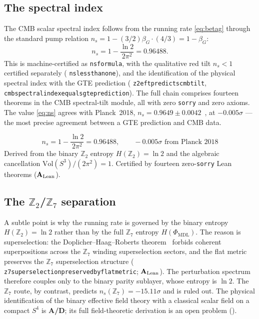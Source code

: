 \documentclass[11pt]{article}
\theoremstyle{remark}
\newcommand{\PHIMDL}{\Phi_{\mathrm{MDL}}}
\newcommand{\ZS}{\mathbb{Z}_7}
\newcommand{\ZT}{\mathbb{Z}_2}
\newcommand{\lean}[1]{%
  \penalty-100
  \begingroup\def\_{\textunderscore\allowbreak}\texttt{#1}\endgroup}
\newcommand{\ns}{n_s}
\newcommand{\betaG}{\beta_G}
\newcommand{\CatAL}{\ensuremath{\textbf{A}_{\rm Lean}}}
\newcommand{\CatAD}{\textbf{A/D}}
\begin{document}
\subsection{The spectral index}

The CMB scalar spectral index follows from the running rate \eqref{eq:betag}
through the standard pump relation $\ns = 1 - (3/2)\betaG\cdot(4/3) = 1 - \betaG$:
\begin{equation}
  \boxed{\ \ns = 1 - \frac{\ln 2}{2\pi^2} = 0.96488.\ }
  \label{eq:ns}
\end{equation}
This is machine-certified as \lean{n\_s\_formula}, with the qualitative red tilt
$\ns < 1$ certified separately (\lean{n\_s\_less\_than\_one}), and the identification
of the physical spectral index with the GTE prediction
(\lean{z2\_eft\_predicts\_cmb\_tilt}, \lean{cmb\_spectral\_index\_equals\_gte\_prediction}).
The full chain comprises fourteen theorems in the CMB spectral-tilt module, all with
zero \texttt{sorry} and zero axioms. The value \eqref{eq:ns} agrees with Planck~2018,
$\ns = 0.9649 \pm 0.0042$~\cite{Planck2018}, at $-0.005\sigma$ --- the most precise
agreement between a GTE prediction and CMB data.

\begin{tcolorbox}[colback=green!5,colframe=green!50!black,
  title={\textbf{Key Result: CMB Scalar Spectral Index}},
  fonttitle=\bfseries,left=6pt,right=6pt,top=5pt,bottom=5pt]
\small
\[
  \ns = 1 - \frac{\ln 2}{2\pi^2} = 0.96488,\qquad
  -0.005\sigma\text{ from Planck~2018}
\]
Derived from the binary $\ZT$ entropy $H(\ZT)=\ln 2$ and the algebraic
cancellation $\mathrm{Vol}(S^3)/(2\pi^2)=1$.  Certified by fourteen
zero-\texttt{sorry} Lean theorems (\CatAL).
\end{tcolorbox}

\subsection{The $\ZT$/$\ZS$ separation}

A subtle point is why the running rate is governed by the binary entropy $H(\ZT) =
\ln 2$ rather than by the full $\ZS$ entropy $H(\PHIMDL)$. The reason is
superselection: the Doplicher--Haag--Roberts theorem~\cite{Doplicher1971} forbids
coherent superpositions across the $\ZS$ winding superselection sectors, and the
flat metric preserves the $\ZS$ superselection structure
(\lean{z7\_superselection\_preserved\_by\_flat\_metric}; \CatAL). The perturbation
spectrum therefore couples only to the binary parity sublayer, whose entropy is
$\ln 2$. The $\ZS$ route, by contrast, predicts $\ns(\ZS) = -15.11\sigma$ and is
ruled out. The physical identification of the binary effective field theory with a
classical scalar field on a compact $S^4$ is \CatAD; its full field-theoretic
derivation is an open problem ().
\end{document}
